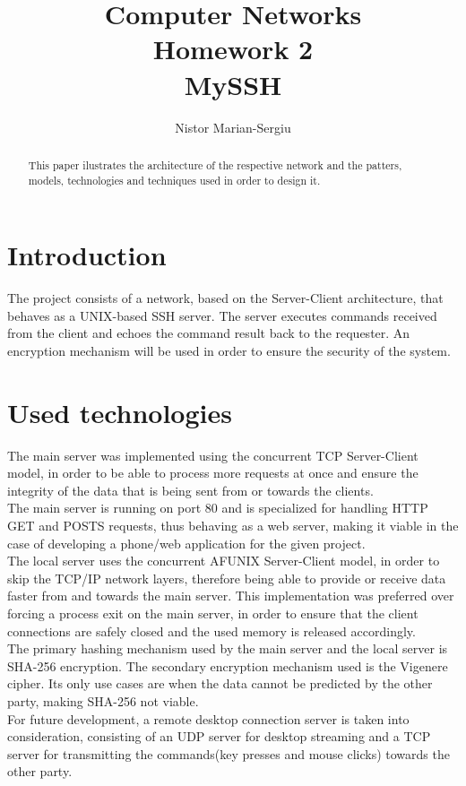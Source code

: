 \documentclass[runningheads]{llncs}
\begin{document}
\title{Computer Networks\\ Homework 2\\ MySSH}
\author{Nistor Marian-Sergiu}

\maketitle

\begin{abstract}
This paper ilustrates the architecture of the respective network and the patters, models, technologies and techniques used in order to design it.

\end{abstract}

\section{Introduction}
The project consists of a network, based on the Server-Client architecture, that behaves as a UNIX-based SSH server. The server executes commands received from the client and echoes the command result back to the requester. An encryption mechanism will be used in order to ensure the security of the system.

\section{Used technologies}
The main server was implemented using the concurrent TCP Server-Client model, in order to be able to process more requests at once and ensure the integrity of the data that is being sent from or towards the clients.\\
The main server is running on port 80 and is specialized for handling HTTP GET and POSTS requests, thus behaving as a web server, making it viable in the case of developing a phone/web application for the given project.\\
The local server uses the concurrent AF\textunderscore UNIX Server-Client model, in order to skip the TCP/IP network layers, therefore being able to provide or receive data faster from and towards the main server. This implementation was preferred over forcing a process exit on the main server, in order to ensure that the client connections are safely closed and the used memory is released accordingly.\\
The primary hashing mechanism used by the main server and the local server is SHA-256 encryption. The secondary encryption mechanism used is the Vigenere cipher. Its only use cases are when the data cannot be predicted by the other party, making SHA-256 not viable.\\
For future development, a remote desktop connection server is taken into consideration, consisting of an UDP server for desktop streaming and a TCP server for transmitting the commands(key presses and mouse clicks) towards the other party.
\end{document}
